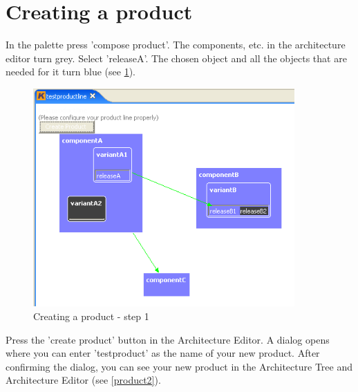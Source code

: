 \section{Creating a product}

In the palette press 'compose product'. The components, etc. in the architecture editor turn
grey. Select 'releaseA'. The chosen object and all the objects that are needed for it turn blue (see \ref{product1}). 

\begin{figure}[h!]
\begin{center}
\includegraphics[width=10cm]{tutorial14.png}
   \caption{Creating a product - step 1}
   \label{product1}
\end{center}
\end{figure}\par


Press the 
'create product' button in the Architecture Editor. A dialog opens where you can enter 'testproduct' as
the name of your new product. After confirming the dialog, you can see
your new product in the Architecture Tree and Architecture Editor (see \ref{product2}).

